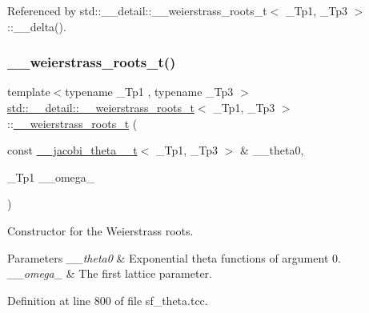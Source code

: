 Referenced by std\+::\+\_\+\+\_\+detail\+::\+\_\+\+\_\+weierstrass\+\_\+roots\+\_\+t$<$ \+\_\+\+Tp1, \+\_\+\+Tp3 $>$\+::\+\_\+\+\_\+delta().

\mbox{\label{structstd_1_1____detail_1_1____weierstrass__roots__t_a032b7fead8c0379bcaf4594f40b78c28}} 
\subsubsection{\texorpdfstring{\+\_\+\+\_\+weierstrass\+\_\+roots\+\_\+t()}{\_\_weierstrass\_roots\_t()}\hspace{0.1cm}{\footnotesize\ttfamily [2/2]}}
{\footnotesize\ttfamily template$<$typename \+\_\+\+Tp1 , typename \+\_\+\+Tp3 $>$ \\
\hyperlink{structstd_1_1____detail_1_1____weierstrass__roots__t}{std\+::\+\_\+\+\_\+detail\+::\+\_\+\+\_\+weierstrass\+\_\+roots\+\_\+t}$<$ \+\_\+\+Tp1, \+\_\+\+Tp3 $>$\+::\hyperlink{structstd_1_1____detail_1_1____weierstrass__roots__t}{\+\_\+\+\_\+weierstrass\+\_\+roots\+\_\+t} (\begin{DoxyParamCaption}\item[{const \hyperlink{structstd_1_1____detail_1_1____jacobi__theta__0__t}{\+\_\+\+\_\+jacobi\+\_\+theta\+\_\+0\+\_\+t}$<$ \+\_\+\+Tp1, \+\_\+\+Tp3 $>$ \&}]{\+\_\+\+\_\+theta0,  }\item[{\+\_\+\+Tp1}]{\+\_\+\+\_\+omega\+\_ }\end{DoxyParamCaption})}

Constructor for the Weierstrass roots.


\begin{DoxyParams}{Parameters}
{\em \+\_\+\+\_\+theta0} & Exponential theta functions of argument 0. \\
\hline
{\em \+\_\+\+\_\+omega\+\_} & The first lattice parameter. \\
\hline
\end{DoxyParams}


Definition at line 800 of file sf\+\_\+theta.\+tcc.



